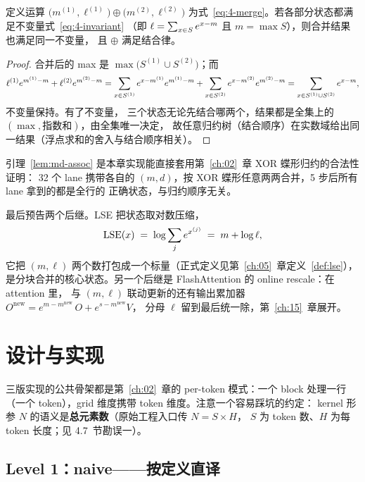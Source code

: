 \begin{lemma}[二元合并的结合律]\label{lem:md-assoc}
  定义运算 $\bigl(m^{(1)},\ell^{(1)}\bigr) \oplus \bigl(m^{(2)},\ell^{(2)}\bigr)$
  为式~\ref{eq:4-merge}。若各部分状态都满足不变量式~\ref{eq:4-invariant}
  （即 $\ell = \sum\sb{x \in S} e^{x - m}$ 且 $m = \max S$），则合并结果也满足同一不变量，
  且 $\oplus$ 满足结合律。
\end{lemma}
\begin{proof}
  合并后的 max 是 $\max\bigl(S^{(1)} \cup S^{(2)}\bigr)$；而
  \begin{equation*}
    \ell^{(1)} e^{m^{(1)}-m} + \ell^{(2)} e^{m^{(2)}-m}
    = \sum\sb{x \in S^{(1)}} e^{x-m^{(1)}} e^{m^{(1)}-m}
    + \sum\sb{x \in S^{(2)}} e^{x-m^{(2)}} e^{m^{(2)}-m}
    = \sum\sb{x \in S^{(1)} \cup S^{(2)}} e^{x - m},
  \end{equation*}
  不变量保持。有了不变量，
  三个状态无论先结合哪两个，结果都是全集上的 $(\max, \text{指数和})$，由全集唯一决定，
  故任意归约树（结合顺序）在实数域给出同一结果（浮点求和的舍入与结合顺序相关）。
\end{proof}

引理~\ref{lem:md-assoc} 是本章实现能直接套用第~\ref{ch:02}~章 XOR 蝶形归约的合法性证明：
32 个 lane 携带各自的 $(m, d)$，按 XOR 蝶形任意两两合并，5 步后所有 lane 拿到的都是全行的
正确状态，与归约顺序无关。

最后预告两个后继。LSE 把状态取对数压缩，
\begin{equation}
  \mathrm{LSE}(x) \;=\; \log \sum\sb{j} e^{x^{(j)}} \;=\; m + \log \ell ,
  \label{eq:4-lse}
\end{equation}
它把 $(m, \ell)$ 两个数打包成一个标量（正式定义见第~\ref{ch:05}~章定义~\ref{def:lse}），
是分块合并的核心状态。另一个后继是 FlashAttention 的 online rescale：在 attention 里，
与 $(m,\ell)$ 联动更新的还有输出累加器
$O^{\mathrm{new}} = e^{m - m^{\mathrm{new}}}\, O + e^{s - m^{\mathrm{new}}} V$，
分母 $\ell$ 留到最后统一除，第~\ref{ch:15}~章展开。

\section{设计与实现}

三版实现的公共骨架都是第~\ref{ch:02}~章的 per-token 模式：一个 block 处理一行
（一个 token），grid 维度携带 token 维度。注意一个容易踩坑的约定：
kernel 形参 $N$ 的语义是\textbf{总元素数}（原始工程入口传 $N = S \times H$，
$S$ 为 token 数、$H$ 为每 token 长度；见 4.7~节勘误一）。

\subsection{Level 1：naive——按定义直译}

